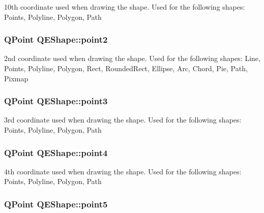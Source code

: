 \label{classQEShape_a3557c0b5e19c30b482b774f1da72313c}
10th coordinate used when drawing the shape. Used for the following shapes: Points, Polyline, Polygon, Path \hypertarget{classQEShape_a90d874fd63000ddac67e54d931b2de71}{
\subsubsection[{point2}]{\setlength{\rightskip}{0pt plus 5cm}QPoint QEShape::point2}}
\label{classQEShape_a90d874fd63000ddac67e54d931b2de71}
2nd coordinate used when drawing the shape. Used for the following shapes: Line, Points, Polyline, Polygon, Rect, RoundedRect, Ellipse, Arc, Chord, Pie, Path, Pixmap \hypertarget{classQEShape_ab37cdcf0b135616c54aa2988c39f998a}{
\subsubsection[{point3}]{\setlength{\rightskip}{0pt plus 5cm}QPoint QEShape::point3}}
\label{classQEShape_ab37cdcf0b135616c54aa2988c39f998a}
3rd coordinate used when drawing the shape. Used for the following shapes: Points, Polyline, Polygon, Path \hypertarget{classQEShape_aaaee931eb20aeb2198c3333c7f270292}{
\subsubsection[{point4}]{\setlength{\rightskip}{0pt plus 5cm}QPoint QEShape::point4}}
\label{classQEShape_aaaee931eb20aeb2198c3333c7f270292}
4th coordinate used when drawing the shape. Used for the following shapes: Points, Polyline, Polygon, Path \hypertarget{classQEShape_aa7eaf5fd15ec4d2e799a7f39bf4e9cef}{
\subsubsection[{point5}]{\setlength{\rightskip}{0pt plus 5cm}QPoint QEShape::point5}}
